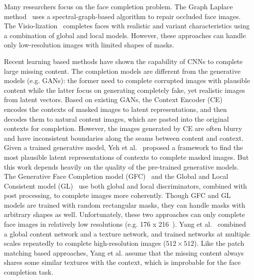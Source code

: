 \documentclass[acmtog,timestamp]{acmart}
\begin{document}
Many researchers focus on the face completion problem. The Graph Laplace method~\cite{deng2011graph} uses a spectral-graph-based algorithm to repair occluded face images. The Visio-lization~\cite{mohammed2009visio} completes faces with realistic and variant characteristics using a combination of global and local models. However, these approaches can handle only low-resolution images with limited shapes of masks. 

Recent learning based methods have shown the capability of CNNs to complete large missing content. The completion models are different from the generative models (e.g. GANs): the former need to complete corrupted images with plausible content while the latter focus on generating completely fake, yet realistic images from latent vectors. Based on existing GANs, the Context Encoder (CE) ~\cite{pathak2016context} encodes the contexts of masked images to latent representations, and then decodes them to natural content images, which are pasted into the original contexts for completion. However, the images generated by CE are often blurry and have inconsistent boundaries along the seams between content and context. Given a trained generative model, Yeh et al.~\cite{yeh2017semantic} proposed a framework to find the most plausible latent representations of contexts to complete masked images. But this work depends heavily on the quality of the pre-trained generative models.  The Generative Face Completion model (GFC)~\cite{li2017generative} and the Global and Local Consistent model (GL)~\cite{iizuka2017globally} use both global and local discriminators, combined with post processing, to complete images more coherently. Though GFC and GL models are trained with random rectangular masks, they can handle masks with arbitrary shapes as well. Unfortunately, these two approaches can only complete face images in relatively low resolutions (e.g. 176 x 216~\cite{iizuka2017globally}). Yang et al.~\cite{yang2016high} combined a global content network and a texture network, and trained networks at multiple scales repeatedly to complete high-resolution images ($512\times512$). Like the patch matching based approaches, Yang et al. assume that the missing content always shares some similar textures with the context, which is improbable for the face completion task. 
\end{document}
